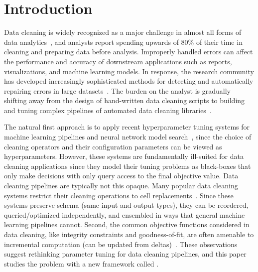 \section{Introduction}\label{intro}\sloppy
Data cleaning is widely recognized as a major challenge in almost all forms of data analytics~\cite{nytimes}, and analysts report spending upwards of 80\% of their time in cleaning and preparing data before analysis. 
Improperly handled errors can affect the performance and accuracy of downstream applications such as reports, visualizations, and machine learning models.
In response, the research community has developed increasingly sophisticated methods for detecting and automatically repairing errors in large datasets~\cite{dc, rekatsinas2017holoclean, DBLP:journals/pvldb/KrishnanWWFG16, DBLP:conf/sigmod/ChuIKW16, mudgal2018deep, doan2018toward}.
The burden on the analyst is gradually shifting away from the design of hand-written data cleaning scripts to building and tuning complex pipelines of automated data cleaning libraries~\cite{krishnan2016hilda}.

The natural first approach is to apply recent hyperparameter tuning systems for machine learning pipelines and neural network model search~\cite{li2017hyperband, sparks2017keystoneml, baylor2017tfx, golovin2017google, liaw2018tune}, since the choice of cleaning operators and their configuration parameters can be viewed as hyperparameters.
However, these systems are fundamentally ill-suited for data cleaning applications since they model their tuning problems as black-boxes that only make decisions with only query access to the final objective value.
Data cleaning pipelines are typically not this opaque.
Many popular data cleaning systems restrict their cleaning operations to cell replacements~\cite{rekatsinas2017holoclean,DBLP:conf/sigmod/ChuIKW16, DBLP:journals/pvldb/KrishnanWWFG16}.
Since these systems preserve schema (same input and output types), they can be reordered, queried/optimized independently, and ensembled in ways that general machine learning pipelines cannot.
Second, the common objective functions considered in data cleaning, like integrity constraints and goodness-of-fit, are often amenable to incremental computation (can be updated from deltas)~\cite{fan2014incremental}.
These observations suggest rethinking parameter tuning for data cleaning pipelines, and this paper studies the problem with a new framework called \sys.

